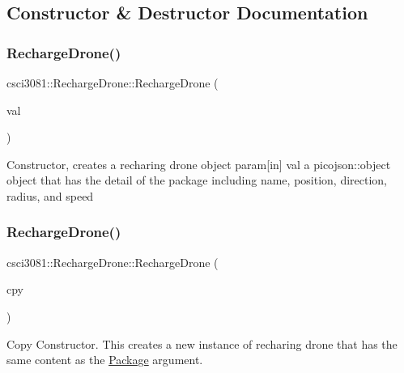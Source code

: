 \subsection{Constructor \& Destructor Documentation}
\mbox{\label{classcsci3081_1_1RechargeDrone_a04313869575a751f7f763cf72c2e6410}} 
\subsubsection{\texorpdfstring{Recharge\+Drone()}{RechargeDrone()}\hspace{0.1cm}{\footnotesize\ttfamily [1/2]}}
{\footnotesize\ttfamily csci3081\+::\+Recharge\+Drone\+::\+Recharge\+Drone (\begin{DoxyParamCaption}\item[{const picojson\+::object \&}]{val }\end{DoxyParamCaption})}

Constructor, creates a recharing drone object param\mbox{[}in\mbox{]} val a picojson\+::object object that has the detail of the package including name, position, direction, radius, and speed \mbox{\label{classcsci3081_1_1RechargeDrone_aa7f639598af768a3c92c082f5d4e74fd}} 
\subsubsection{\texorpdfstring{Recharge\+Drone()}{RechargeDrone()}\hspace{0.1cm}{\footnotesize\ttfamily [2/2]}}
{\footnotesize\ttfamily csci3081\+::\+Recharge\+Drone\+::\+Recharge\+Drone (\begin{DoxyParamCaption}\item[{\hyperlink{classcsci3081_1_1RechargeDrone}{Recharge\+Drone} \&}]{cpy }\end{DoxyParamCaption})}



Copy Constructor. This creates a new instance of recharing drone that has the same content as the \hyperlink{classcsci3081_1_1Package}{Package} argument. 


